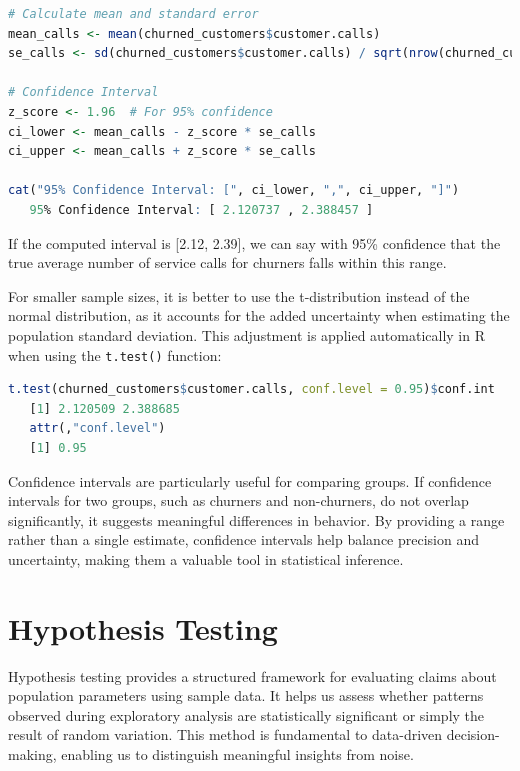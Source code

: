 \documentclass[
  11pt,
]{book}
\newcommand{\passthrough}[1]{#1}
\theoremstyle{definition}
\theoremstyle{definition}
\theoremstyle{definition}
\theoremstyle{definition}
\theoremstyle{remark}
\begin{document}
\begin{lstlisting}[language=R]
# Calculate mean and standard error
mean_calls <- mean(churned_customers$customer.calls)
se_calls <- sd(churned_customers$customer.calls) / sqrt(nrow(churned_customers))

# Confidence Interval
z_score <- 1.96  # For 95% confidence
ci_lower <- mean_calls - z_score * se_calls
ci_upper <- mean_calls + z_score * se_calls

cat("95% Confidence Interval: [", ci_lower, ",", ci_upper, "]")
   95% Confidence Interval: [ 2.120737 , 2.388457 ]
\end{lstlisting}

If the computed interval is {[}2.12, 2.39{]}, we can say with 95\% confidence that the true average number of service calls for churners falls within this range.

For smaller sample sizes, it is better to use the t-distribution instead of the normal distribution, as it accounts for the added uncertainty when estimating the population standard deviation. This adjustment is applied automatically in R when using the \passthrough{\lstinline!t.test()!} function:

\begin{lstlisting}[language=R]
t.test(churned_customers$customer.calls, conf.level = 0.95)$conf.int
   [1] 2.120509 2.388685
   attr(,"conf.level")
   [1] 0.95
\end{lstlisting}

Confidence intervals are particularly useful for comparing groups. If confidence intervals for two groups, such as churners and non-churners, do not overlap significantly, it suggests meaningful differences in behavior. By providing a range rather than a single estimate, confidence intervals help balance precision and uncertainty, making them a valuable tool in statistical inference.

\section{Hypothesis Testing}\label{hypothesis-testing}

Hypothesis testing provides a structured framework for evaluating claims about population parameters using sample data. It helps us assess whether patterns observed during exploratory analysis are statistically significant or simply the result of random variation. This method is fundamental to data-driven decision-making, enabling us to distinguish meaningful insights from noise.
\end{document}
